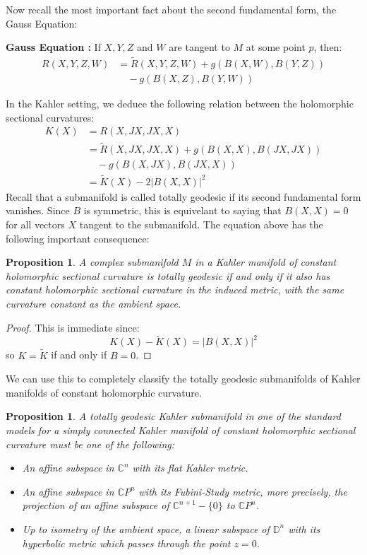 \documentclass[11pt]{amsart}
\newtheorem{prop}[subsection]{Proposition}
\theoremstyle{definition}
\def \CP{ \mathbb{C}P }
\def \C{ \mathbb{C} }
\def \disk{ \mathbb{D} }
\def \Ramb{ \tilde{R} }
\def \Kamb{ \tilde{K} }
\begin{document}
Now recall the most important fact about the second fundamental form, the Gauss Equation:

{ \bf Gauss Equation : } If $X,Y,Z$ and $W$ are tangent to $M$ at some point $p$, then:
%
\begin{align*}
 R(X,Y,Z,W) &= \Ramb (X,Y,Z,W) + g( B(X,W), B(Y,Z) ) \\
& \quad - g( B(X,Z), B(Y,W) ) 
\end{align*}

In the Kahler setting, we deduce the following relation between the holomorphic sectional curvatures:
%
\begin{align*}
K(X) &= R(X,JX,JX,X) \\
&= \Ramb (X,JX,JX,X) + g( B(X,X), B(JX,JX) ) \\
& \quad - g( B(X,JX), B(JX,X) ) \\
&= \Kamb (X) - 2 | B(X,X) |^2
\end{align*}
%
Recall that a submanifold is called totally geodesic if its second fundamental form vanishes.  Since $B$ is symmetric, this is equivelant to saying that $B(X,X) = 0$ for all vectors $X$ tangent to the submanifold.  The equation above has the following important consequence:

\begin{prop}
A complex submanifold $M$ in a Kahler manifold of constant holomorphic sectional curvature is totally geodesic if and only if it also has constant holomorphic sectional curvature in the induced metric, with the same curvature constant as the ambient space.
\end{prop}

\begin{proof}
This is immediate since:
%
$$ K(X) - \Kamb (X) = |B(X,X)|^2 $$
%
so $K = \Kamb$ if and only if $B = 0$.
\end{proof}

We can use this to completely classify the totally geodesic submanifolds of Kahler manifolds of constant holomorphic curvature.

\begin{prop}  A totally geodesic Kahler submanifold in one of the standard models for a simply connected Kahler manifold of constant holomorphic sectional curvature must be one of the following:
%
\begin{itemize}
%
\item An affine subspace in $\C^n$ with its flat Kahler metric.
\item An affine subspace in $\CP^n$ with its Fubini-Study metric, more precisely, the projection of an affine subspace of $\C^{n+1} - \{0\}$ to $\CP^n$.
\item Up to isometry of the ambient space, a linear subspace of $\disk^n$ with its hyperbolic metric which passes through the point $z = 0$.
%
\end{itemize}
%
\end{prop}
\end{document}
